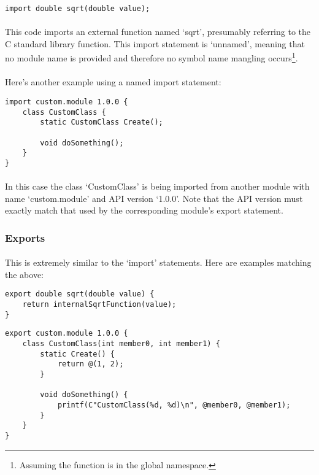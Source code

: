 \documentclass[12pt,twoside,notitlepage]{report}
\begin{document}
\begin{lstlisting}
import double sqrt(double value);
\end{lstlisting}

\paragraph{}
This code imports an external function named `sqrt', presumably referring to the C standard library function. This import statement is `unnamed', meaning that no module name is provided and therefore no symbol name mangling occurs\footnote{Assuming the function is in the global namespace.}.

\paragraph{}
Here's another example using a named import statement:

\begin{lstlisting}
import custom.module 1.0.0 {
	class CustomClass {
		static CustomClass Create();
		
		void doSomething();
	}
}
\end{lstlisting}

\paragraph{}
In this case the class `CustomClass' is being imported from another module with name `custom.module' and API version `1.0.0'. Note that the API version must exactly match that used by the corresponding module's export statement.

\subsubsection{Exports}

\paragraph{}
This is extremely similar to the `import' statements. Here are examples matching the above:

\begin{lstlisting}
export double sqrt(double value) {
	return internalSqrtFunction(value);
}
\end{lstlisting}

\begin{lstlisting}
export custom.module 1.0.0 {
	class CustomClass(int member0, int member1) {
		static Create() {
			return @(1, 2);
		}
		
		void doSomething() {
			printf(C"CustomClass(%d, %d)\n", @member0, @member1);
		}
	}
}
\end{lstlisting}
\end{document}
